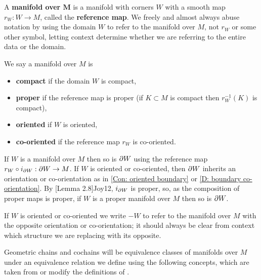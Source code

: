 \begin{definition}\label{V: maps are co-oriented}
A \textbf{manifold over $\mathbf{M}$} is a manifold with corners $W$ with a smooth map $r_W : W \to M$,
called the \textbf{reference map}. We freely and almost always abuse notation
by using the domain $W$ to refer to the manifold over $M$, not $r_W$ or some other symbol, letting
context determine whether we are referring to the entire data or the domain.

We say a manifold over $M$ is
\begin{itemize}
\item \textbf{compact} if the domain $W$ is compact,
\item \textbf{proper} if the reference map is proper (if $K \subset M$ is compact then $r_W^{-1}(K)$ is compact),
\item \textbf{oriented} if $W$ is oriented,
\item \textbf{co-oriented} if the reference map $r_W$ is co-oriented.
\end{itemize}
If $W$ is a manifold over $M$ then so is $\partial W$ using the reference map $r_W \circ i_{\partial W}:\partial W \to M$.
If $W$ is oriented or co-oriented, then $\partial W$ inherits an orientation or co-orientation as in \cref{Con: oriented boundary} or \cref{D: boundary co-orientation}. By [Lemma 2.8]{Joy12}, $i_{\partial W}$ is proper, so, as the composition of proper maps is proper, if $W$ is a proper manifold over $M$ then so is $\partial W$.

If $W$ is oriented or co-oriented we write $-W$ to refer to the manifold over $M$ with the opposite orientation or co-orientation; it should always be clear from context which structure we are replacing with its opposite.
\end{definition}




Geometric chains and cochains will be equivalence classes of manifolds over $M$ under an equivalence relation we define using the following concepts, which are taken from or modify
the definitions of \cite{Lipy14}.




